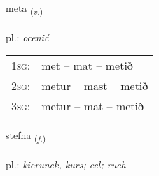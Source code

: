 \documentclass[frontgrid, backgrid]{flacards}\usepackage[]{graphicx}\usepackage[]{xcolor}
\begin{document}
\renewcommand{\flhead}{\vskip5pt \fboxsep=0pt {\small\bfseries\footnotesize Sagnorð | Verb}}
\renewcommand{\fcfoot}{\vskip5pt \fboxsep=0pt \hspace{2pt}{\small\bfseries\footnotesize 1K}}

\renewcommand{\blhead}{\vskip5pt {\small\bfseries\footnotesize Sagnorð | Verb }}
\renewcommand{\bcfoot}{\vskip5pt \hspace{2pt}{\small\bfseries\footnotesize 1K}}


{meta \small{\textsubscript{(\textit{v.})}} \\[1ex] %
\textphonetic{[mɛːta]} \\
pl.: \emph{ocenić} \\  [2ex]
\renewcommand*{\arraystretch}{0.8}
\begin{tabular}{p{1cm}l}
\textsc{1sg}: & met -- mat -- metið \\ 
\textsc{2sg}: & metur -- mast -- metið \\ 
\textsc{3sg}: & metur -- mat -- metið \\ 
\end{tabular}
}

\renewcommand{\flhead}{\vskip5pt \fboxsep=0pt {\small\bfseries\footnotesize Nafnorð | Noun}}
\renewcommand{\fcfoot}{\vskip5pt \fboxsep=0pt \hspace{2pt}{\small\bfseries\footnotesize 1K}}

\renewcommand{\blhead}{\vskip5pt {\small\bfseries\footnotesize Nafnorð | Noun }}
\renewcommand{\bcfoot}{\vskip5pt \hspace{2pt}{\small\bfseries\footnotesize 1K}}


{stefna \small{\textsubscript{(\textit{f.})}} \\[1ex] %
\textphonetic{[stɛpna]} \\
pl.: \emph{kierunek, kurs; cel; ruch} \\  [2ex]
\renewcommand*{\arraystretch}{0.8}
}
\end{document}

